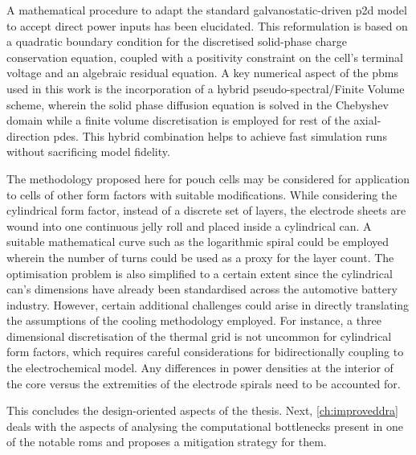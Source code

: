 A mathematical procedure to adapt the standard galvanostatic-driven \gls{p2d}
model to accept direct power inputs has been elucidated. This reformulation is
based on a quadratic boundary condition for the discretised solid-phase charge
conservation equation, coupled with a positivity constraint on the cell's
terminal voltage and an algebraic residual equation. A key numerical aspect of
the \glspl{pbm} used in this work is the incorporation of a hybrid
pseudo-spectral/Finite Volume scheme, wherein the solid phase diffusion equation
is solved in the Chebyshev domain while a finite volume discretisation is
employed for rest of the axial-direction \glspl{pde}. This hybrid combination
helps to achieve fast simulation runs without sacrificing model fidelity.

The methodology proposed here for pouch cells may be considered for application
to cells of other form factors with suitable modifications. While considering
the cylindrical form factor, instead of a discrete set of layers, the electrode
sheets are wound into one continuous jelly roll and placed inside a cylindrical
can.  A suitable mathematical curve such as the logarithmic spiral could be
employed wherein the number of turns could be used as a proxy for the layer
count. The optimisation problem is also simplified to a certain extent since the
cylindrical can's dimensions have already been standardised across the
automotive battery industry. However, certain additional challenges could arise
in directly translating the assumptions of the cooling methodology employed. For
instance, a three dimensional discretisation of the thermal grid is not uncommon
for cylindrical form factors, which requires careful considerations for
bidirectionally coupling to the electrochemical model. Any differences in power
densities at the interior of the core versus the extremities of the electrode
spirals need to be accounted for.

This concludes the design-oriented aspects of the thesis. Next,
\cref{ch:improveddra} deals with the aspects of analysing the computational
bottlenecks present in one of the notable \glspl{rom} and proposes a mitigation
strategy for them.





